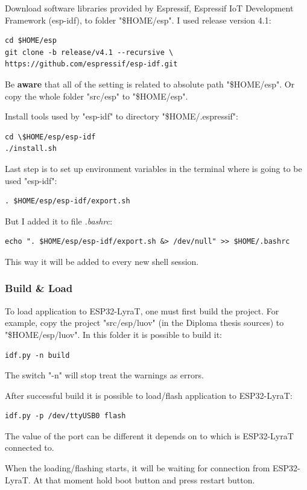 \documentclass[thesis=M,english]{FITthesis}[2019/12/23]
\begin{document}
\bigskip
\noindent
Download software libraries provided by Espressif, Espressif IoT Development Framework (esp-idf), to folder "\$HOME/esp". I used release version 4.1:
\begin{lstlisting}[frame=single]
cd $HOME/esp
git clone -b release/v4.1 --recursive \
https://github.com/espressif/esp-idf.git
\end{lstlisting}
Be \textbf{aware} that all of the setting is related to absolute path "\$HOME/esp". Or copy the whole folder "src/esp" to "\$HOME/esp".

\bigskip
\noindent
Install tools used by "esp-idf" to directory "\$HOME/.espressif":
\begin{lstlisting}[frame=single]
cd \$HOME/esp/esp-idf
./install.sh
\end{lstlisting}

\bigskip
\noindent
Last step is to set up environment variables in the terminal where is going to be used "esp-idf":
\begin{lstlisting}[frame=single]
. $HOME/esp/esp-idf/export.sh
\end{lstlisting}
But I added it to file \textit{.bashrc}:
\begin{lstlisting}[frame=single]
echo ". $HOME/esp/esp-idf/export.sh &> /dev/null" >> $HOME/.bashrc
\end{lstlisting}
This way it will be added to every new shell session.

\subsubsection{Build \& Load}
To load application to ESP32-LyraT, one must first build the project. For example, copy the project "src/esp/luov" (in the Diploma thesis sources) to "\$HOME/esp/luov". In this folder it is possible to build it:
\begin{lstlisting}[frame=single]
idf.py -n build
\end{lstlisting}
The switch "-n" will stop treat the warnings as errors.

\bigskip
\noindent
After successful build it is possible to load/flash application to ESP32-LyraT:
\begin{lstlisting}[frame=single]
idf.py -p /dev/ttyUSB0 flash
\end{lstlisting}
The value of the port can be different it depends on to which is ESP32-LyraT connected to.

\bigskip
\noindent
When the loading/flashing starts, it will be waiting for connection from ESP32-LyraT. At that moment hold boot button and press restart button.
\end{document}
